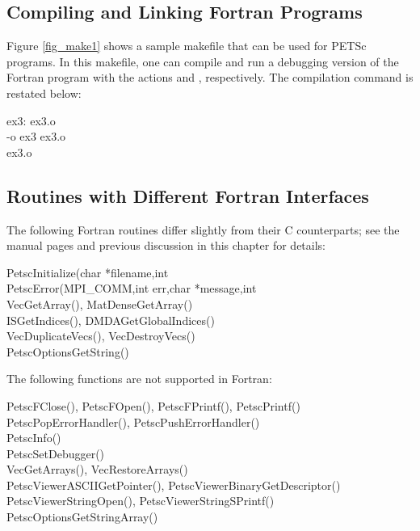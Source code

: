 \subsection{Compiling and Linking Fortran Programs}
\label{sec_fortcompile}

Figure \ref{fig_make1} shows a sample makefile that can be used for
PETSc programs.  In this makefile, one can compile and run a debugging version
of the Fortran program  with the actions    and
 , respectively. The compilation command is restated below:
\begin{tabbing}
   ex3: ex3.o \\
    -o ex3 ex3.o \\
    ex3.o
\end{tabbing}

\subsection{Routines with Different Fortran Interfaces}
\label{sec_fortran_exceptions}

The following Fortran routines differ slightly from their C counterparts; see the
manual pages and previous discussion in this chapter for details:
\begin{tabbing}
 PetscInitialize(char *filename,int \\
 PetscError(MPI\_COMM,int err,char *message,int \\
 VecGetArray(), MatDenseGetArray()\\
 ISGetIndices(), DMDAGetGlobalIndices()\\
 VecDuplicateVecs(), VecDestroyVecs()\\
 PetscOptionsGetString()
\end{tabbing}
The following functions are not supported in Fortran:
\begin{tabbing}
 PetscFClose(), PetscFOpen(), PetscFPrintf(), PetscPrintf()\\
 PetscPopErrorHandler(), PetscPushErrorHandler()\\
 PetscInfo()\\
 PetscSetDebugger()\\
 VecGetArrays(), VecRestoreArrays()\\
 PetscViewerASCIIGetPointer(), PetscViewerBinaryGetDescriptor()\\
 PetscViewerStringOpen(), PetscViewerStringSPrintf()\\
 PetscOptionsGetStringArray()
\end{tabbing}

